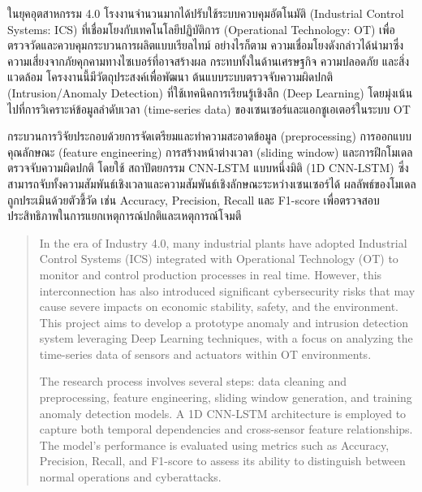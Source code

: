 \maketitle
\makesignature

\ifproject
\begin{abstractTH}
\hspace{2em} ในยุคอุตสาหกรรม 4.0 โรงงานจำนวนมากได้ปรับใช้ระบบควบคุมอัตโนมัติ (Industrial Control Systems: ICS) ที่เชื่อมโยงกับเทคโนโลยีปฏิบัติการ (Operational Technology: OT) เพื่อตรวจวัดและควบคุมกระบวนการผลิตแบบเรียลไทม์ อย่างไรก็ตาม ความเชื่อมโยงดังกล่าวได้นำมาซึ่งความเสี่ยงจากภัยคุกคามทางไซเบอร์ที่อาจสร้างผล กระทบทั้งในด้านเศรษฐกิจ ความปลอดภัย และสิ่งแวดล้อม โครงงานนี้มีวัตถุประสงค์เพื่อพัฒนา ต้นแบบระบบตรวจจับความผิดปกติ (Intrusion/Anomaly Detection) ที่ใช้เทคนิคการเรียนรู้เชิงลึก (Deep Learning) โดยมุ่งเน้นไปที่การวิเคราะห์ข้อมูลลำดับเวลา (time-series data) ของเซนเซอร์และแอกชูเอเตอร์ในระบบ OT

กระบวนการวิจัยประกอบด้วยการจัดเตรียมและทำความสะอาดข้อมูล (preprocessing) การออกแบบคุณลักษณะ (feature engineering) การสร้างหน้าต่างเวลา (sliding window) และการฝึกโมเดลตรวจจับความผิดปกติ โดยใช้ สถาปัตยกรรม CNN-LSTM แบบหนึ่งมิติ (1D CNN-LSTM) ซึ่งสามารถจับทั้งความสัมพันธ์เชิงเวลาและความสัมพันธ์เชิงลักษณะระหว่างเซนเซอร์ได้ ผลลัพธ์ของโมเดลถูกประเมินด้วยตัวชี้วัด เช่น Accuracy, Precision, Recall และ F1-score เพื่อตรวจสอบประสิทธิภาพในการแยกเหตุการณ์ปกติและเหตุการณ์โจมตี
\end{abstractTH}

\begin{abstract}
\hspace{2em} In the era of Industry 4.0, many industrial plants have adopted Industrial Control Systems (ICS) integrated with Operational Technology (OT) to monitor and control production processes in real time. However, this interconnection has also introduced significant cybersecurity risks that may cause severe impacts on economic stability, safety, and the environment. This project aims to develop a prototype anomaly and intrusion detection system leveraging Deep Learning techniques, with a focus on analyzing the time-series data of sensors and actuators within OT environments.

The research process involves several steps: data cleaning and preprocessing, feature engineering, sliding window generation, and training anomaly detection models. A 1D CNN-LSTM architecture is employed to capture both temporal dependencies and cross-sensor feature relationships. The model’s performance is evaluated using metrics such as Accuracy, Precision, Recall, and F1-score to assess its ability to distinguish between normal operations and cyberattacks.
\end{abstract}

